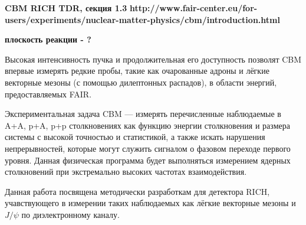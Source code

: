 \todo \textbf{CBM RICH TDR, секция 1.3}
\todo \textbf{http://www.fair-center.eu/for-users/experiments/nuclear-matter-physics/cbm/introduction.html}

\todo \textbf{плоскость реакции - ?}

Высокая интенсивность пучка и продолжительная его доступность позволят CBM впервые измерять редкие пробы, такие как очарованные адроны и лёгкие векторные мезоны (с помощью дилептонных распадов), в области энергий, предоставляемых FAIR.

Экспериментальная задача CBM --- измерять перечисленные наблюдаемые в A+A, p+A, p+p столкновениях как функцию энергии столкновения и размера системы с высокой точностью и статистикой, а также искать нарушения непрерывностей, которые могут служить сигналом о фазовом переходе первого уровня. Данная физическая программа будет выполняться измерением ядерных столкновений при экстремально высоких частотах взаимодействия.

Данная работа посвящена методически разработкам для детектора RICH, учавствующего в измерении таких наблюдаемых как лёгкие векторные мезоны и $J/\psi$ по диэлектронному каналу.











